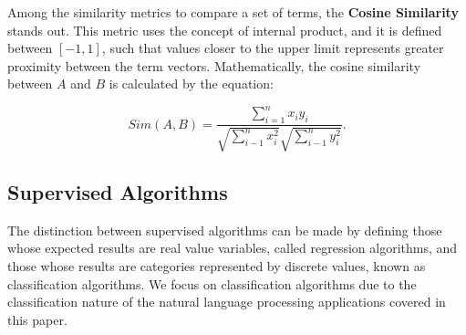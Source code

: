 \documentclass{ieeeaccess}
\begin{document}

Among the similarity metrics to compare a set of terms, the \textbf{Cosine Similarity} stands out. This metric uses the concept of internal product, and it is defined between $ [- 1,1] $, such that values closer to the upper limit represents greater proximity between the term vectors. Mathematically, the cosine similarity between $ A $ and $ B $ is calculated by the equation:

\begin{equation} 
Sim(A,B)=\frac{\sum_{i=1}^{n}x_i y_i}{\sqrt{\sum_{i-1}^{n}x_i^{2}}\sqrt{\sum_{i-1}^{n}y_i^{2} }}.
\label{eq:cosseno}
\end{equation}


\subsection {Supervised Algorithms}
\label{subsec:supervisionados}

The distinction between supervised algorithms can be made by defining those whose expected results are real value variables, called regression algorithms, and those whose results are categories represented by discrete values, known as classification algorithms. We focus on classification algorithms due to the classification nature of the natural language processing applications covered in this paper.

\end{document}
